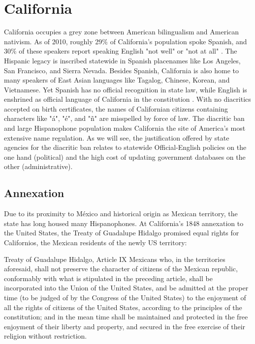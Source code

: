 \section{California}

California occupies a grey zone between American bilingualism and American
nativism. As of 2010, roughly 29\% of California's population spoke Spanish, and
30\% of these speakers report speaking English "not well" or "not at all"
\parencite{acs-lang-states}. The Hispanic legacy is inscribed statewide in
Spanish placenames like Los Angeles, San Francisco, and Sierra Nevada. Besides
Spanish, California is also home to many speakers of East Asian languages like
Tagalog, Chinese, Korean, and Vietnamese. Yet Spanish has no official
recognition in state law, while English is enshrined as official language of
California in the constitution \parencite{ca-const}. With no diacritics accepted
on birth certificates, the names of Californian citizens containing characters
like "á", "é", and "ñ" are misspelled by force of law. The diacritic ban and
large Hispanophone population makes California the site of America's most
extensive name regulation. As we will see, the justification offered by state
agencies for the diacritic ban relates to statewide Official-English policies on
the one hand (political) and the high cost of updating government databases on
the other (administrative).

\subsection{Annexation}

Due to its proximity to México and historical origin as Mexican territory, the
state has long housed many Hispanophones. At California's 1848 annexation to the
United States, the Treaty of Guadalupe
Hidalgo promised equal rights for Californios, the Mexican residents of the
newly US territory: 

\begin{aquote}{Treaty of Guadalupe Hidalgo, Article IX}
	Mexicans who, in the territories aforesaid, shall not preserve the character
	of citizens of the Mexican republic, conformably with what is stipulated in
	the preceding article, shall be incorporated into the Union of the United
	States, and be admitted at the proper time (to be judged of by the Congress of
	the United States) to the enjoyment of all the rights of citizens of the
	United States, according to the principles of the constitution; and in the
	mean time shall be maintained and protected in the free enjoyment of their
	liberty and property, and secured in the free exercise of their religion
	without restriction. \parencite{guadalupe}
\end{aquote}

